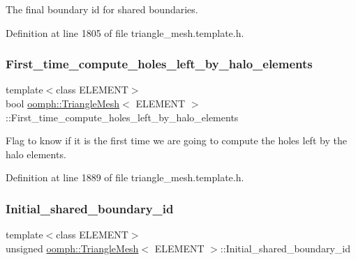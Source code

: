 The final boundary id for shared boundaries. 



Definition at line 1805 of file triangle\+\_\+mesh.\+template.\+h.

\mbox{\label{classoomph_1_1TriangleMesh_ab3953e0939e3fb86a1913faa4698d0b0}} 
\subsubsection{\texorpdfstring{First\+\_\+time\+\_\+compute\+\_\+holes\+\_\+left\+\_\+by\+\_\+halo\+\_\+elements}{First\_time\_compute\_holes\_left\_by\_halo\_elements}}
{\footnotesize\ttfamily template$<$class E\+L\+E\+M\+E\+NT$>$ \\
bool \hyperlink{classoomph_1_1TriangleMesh}{oomph\+::\+Triangle\+Mesh}$<$ E\+L\+E\+M\+E\+NT $>$\+::First\+\_\+time\+\_\+compute\+\_\+holes\+\_\+left\+\_\+by\+\_\+halo\+\_\+elements\hspace{0.3cm}{\ttfamily [protected]}}



Flag to know if it is the first time we are going to compute the holes left by the halo elements. 



Definition at line 1889 of file triangle\+\_\+mesh.\+template.\+h.

\mbox{\label{classoomph_1_1TriangleMesh_a2a450374603e117c534221c13e2cae86}} 
\subsubsection{\texorpdfstring{Initial\+\_\+shared\+\_\+boundary\+\_\+id}{Initial\_shared\_boundary\_id}}
{\footnotesize\ttfamily template$<$class E\+L\+E\+M\+E\+NT$>$ \\
unsigned \hyperlink{classoomph_1_1TriangleMesh}{oomph\+::\+Triangle\+Mesh}$<$ E\+L\+E\+M\+E\+NT $>$\+::Initial\+\_\+shared\+\_\+boundary\+\_\+id\hspace{0.3cm}{\ttfamily [protected]}}



